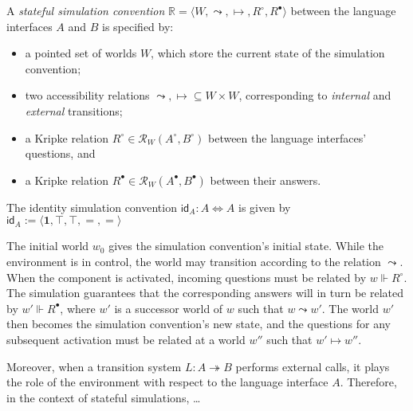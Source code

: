 \documentclass[acmsmall,screen,review,anonymous]{acmart}
\newcommand{\kw}[1]{\ensuremath{ \mathsf{#1} }}
\newcommand{\que}{\circ}
\newcommand{\ans}{\bullet}
\begin{document}
\begin{definition}
A \emph{stateful simulation convention}
$\mathbb{R} = \langle W, {\leadsto}, {\mapsto}, R^\que, R^\ans \rangle$
between the language interfaces $A$ and $B$
is specified by:
\begin{itemize}
  \item a pointed set of worlds $W$,
    which store the current state of the simulation convention;
  \item two accessibility relations
    ${\leadsto}, {\mapsto} \subseteq W \times W$,
    corresponding to \emph{internal} and \emph{external} transitions;
  \item a Kripke relation $R^\que \in \mathcal{R}_W(A^\que, B^\que)$
    between the language interfaces' questions, and
  \item a Kripke relation $R^\ans \in \mathcal{R}_W(A^\ans, B^\ans)$
    between their answers.
\end{itemize}
The identity simulation convention
$\kw{id}_A : A \Leftrightarrow A$
is given by
$\kw{id}_A := \langle \mathbf{1}, \top, \top, {=}, {=} \rangle$
\end{definition}

The initial world $w_0$ gives the simulation convention's initial state.
While the environment is in control,
the world may transition according to the relation $\leadsto$.
When the component is activated,
incoming questions must be related by $w \Vdash R^\que$.
The simulation guarantees that the corresponding answers
will in turn be related by $w' \Vdash R^\ans$,
where $w'$ is a successor world of $w$ such that $w \leadsto w'$.
The world $w'$ then becomes the simulation convention's new state,
and the questions for any subsequent activation
must be related at a world $w''$ such that $w' \mapsto w''$.

Moreover,
when a transition system $L : A \twoheadrightarrow B$ performs external calls,
it plays the role of the environment
with respect to the language interface $A$.
Therefore,
in the context of stateful simulations,
\ldots
\end{document}

